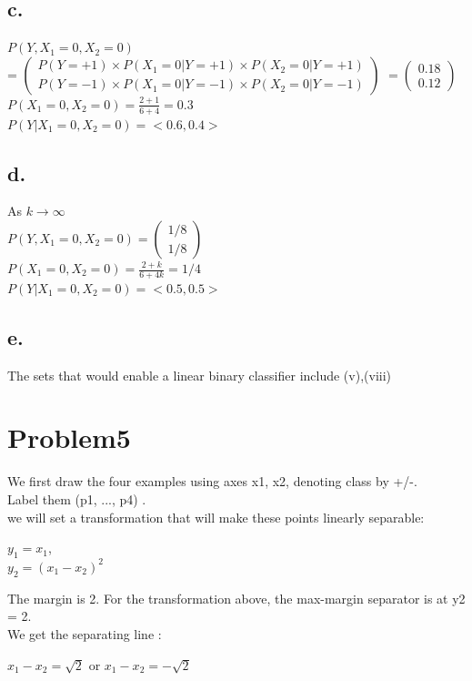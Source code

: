 \documentclass[a4paper,left=2.5cm,right=2.5cm,11pt]{article}
\begin{document}
\subsection*{c.}
$P(Y, X_1 = 0, X_2 = 0) $ \\= $ \begin{pmatrix} P(Y=+1)\times P(X_1=0|Y=+1)\times P(X_2 =0|Y=+1)\\  P(Y=-1)\times P(X_1=0|Y=-1)\times P(X_2 =0|Y=-1)\end{pmatrix}  $  $=\begin{pmatrix} 0.18\\ 0.12  \end{pmatrix}$
\\ $P(X_1 = 0, X_2 = 0) = \frac{2+1}{6+4}  =0.3$
\\ $P(Y|X_1=0,X_2=0) = <0.6, 0.4>$
\subsection*{d.}
As $k \rightarrow \infty $\\
$P(Y, X_1 = 0, X_2 = 0)  = \begin{pmatrix} 1/8\\ 1/8  \end{pmatrix}$\\
$P(X_1 = 0, X_2 = 0) = \frac{2+k}{6+4k}  =1/4$
\\ $P(Y|X_1=0,X_2=0) = <0.5, 0.5>$
\subsection*{e.}
The sets that would enable a linear binary classifier include (v),(viii)

\section*{Problem5}
\begin{flushleft}   We first draw the four examples using axes x1, x2, denoting class by +/-. \\
Label them (p1, ..., p4) .\\
we will set a transformation that will make these points linearly separable:\\
\end{flushleft}
$y_1 = x_1 $, \\$ y_2 = (x_1-x_2)^2$
\\\begin{flushleft}  The margin is 2. For the transformation above, the max-margin separator is at y2 = 2. \\We get the separating line :\\ \end{flushleft}
$x_1 - x_2 = \sqrt{2}$ or $x_1 - x_2 = -\sqrt{2}$
\end{document}
